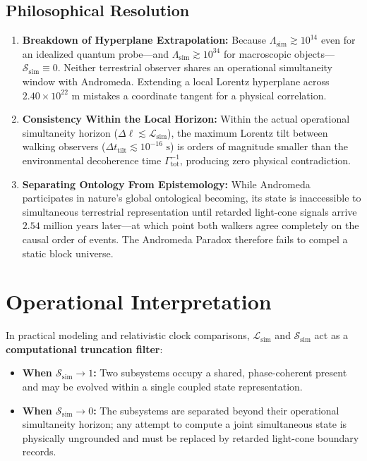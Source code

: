 \documentclass[11pt,a4paper]{article}
\begin{document}
\subsection{Philosophical Resolution}
\begin{enumerate}
    \item \textbf{Breakdown of Hyperplane Extrapolation:} Because $\Lambda_{\mathrm{sim}} \gtrsim 10^{14}$ even for an idealized quantum probe---and $\Lambda_{\mathrm{sim}} \gtrsim 10^{34}$ for macroscopic objects---$\mathcal{S}_{\mathrm{sim}} \equiv 0$. Neither terrestrial observer shares an operational simultaneity window with Andromeda. Extending a local Lorentz hyperplane across $2.40 \times 10^{22}\text{ m}$ mistakes a coordinate tangent for a physical correlation.
    \item \textbf{Consistency Within the Local Horizon:} Within the actual operational simultaneity horizon ($\Delta \ell \lesssim \mathcal{L}_{\mathrm{sim}}$), the maximum Lorentz tilt between walking observers ($\Delta t_{\mathrm{tilt}} \lesssim 10^{-16}\text{ s}$) is orders of magnitude smaller than the environmental decoherence time $\Gamma_{\mathrm{tot}}^{-1}$, producing zero physical contradiction.
    \item \textbf{Separating Ontology From Epistemology:} While Andromeda participates in nature's global ontological becoming, its state is inaccessible to simultaneous terrestrial representation until retarded light-cone signals arrive $2.54\text{ million years}$ later---at which point both walkers agree completely on the causal order of events. The Andromeda Paradox therefore fails to compel a static block universe.
\end{enumerate}

\section{Operational Interpretation}

In practical modeling and relativistic clock comparisons, $\mathcal{L}_{\mathrm{sim}}$ and $\mathcal{S}_{\mathrm{sim}}$ act as a \textbf{computational truncation filter}:
\begin{itemize}
    \item \textbf{When $\mathcal{S}_{\mathrm{sim}} \to 1$:} Two subsystems occupy a shared, phase-coherent present and may be evolved within a single coupled state representation.
    \item \textbf{When $\mathcal{S}_{\mathrm{sim}} \to 0$:} The subsystems are separated beyond their operational simultaneity horizon; any attempt to compute a joint simultaneous state is physically ungrounded and must be replaced by retarded light-cone boundary records.
\end{itemize}
\end{document}
